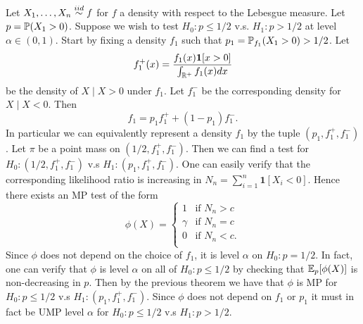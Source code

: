 \begin{example}
	Let $X_1, \dots, X_n \overset{iid}{\sim} f$ for $f$ a density with respect to the Lebesgue measure. Let $p = \mathbb{P}(X_1 > 0)$. Suppose we wish to test $H_0 : p \leq 1/2$ v.s. $H_1 : p > 1/2$ at level $\alpha \in (0, 1)$. Start by fixing a density $f_1$ such that $p_1 = \mathbb{P}_{f_1}(X_1 > 0) > 1/2$. Let \[
		f_1^+(x) = \frac{f_1(x) \mathbf{1}[x > 0]}{\int_{\mathbb{R}^+} f_1(x) dx}
	\] be the density of $X \mid X > 0$ under $f_1$. Let $f_1^-$ be the corresponding density for $X \mid X < 0$. Then \[
		f_1 = p_1 f_1^+ + (1-p_1) f_1^-.
	\] In particular we can equivalently represent a density $f_1$ by the tuple $(p_1, f_1^+, f_1^-)$. Let $\pi$ be a point mass on $(1/2, f_1^+, f_1^-)$. Then we can find a test for $H_0 : (1/2, f_1^+, f_1^-)$ v.s $H_1 : (p_1, f_1^+, f_1^-)$. One can easily verify that the corresponding likelihood ratio is increasing in $N_n = \sum_{i=1}^n \mathbf{1}[X_i < 0]$. Hence there exists an MP test of the form\[
	\phi(X) = \begin{cases}
		1 &\text{if } N_n > c \\
		\gamma &\text{if } N_n = c \\
		0 &\text{if } N_n < c .\\
	\end{cases}
	\]
	Since $\phi$ does not depend on the choice of $f_1$, it is level $\alpha$ on $H_0 : p = 1/2$. In fact, one can verify that $\phi$ is level $\alpha$ on all of $H_0 : p \leq 1/2$ by checking that $\mathbb{E}_p[\phi(X)]$ is non-decreasing in $p$. Then by the previous theorem we have that $\phi$ is MP for $H_0 : p \leq 1/2$ v.s $H_1 : (p_1, f_1^+, f_1^-)$. Since $\phi$ does not depend on $f_1$ or $p_1$ it must in fact be UMP level $\alpha$ for $H_0 : p \leq 1/2$ v.s $H_1 : p > 1/2$.
	
\end{example}
